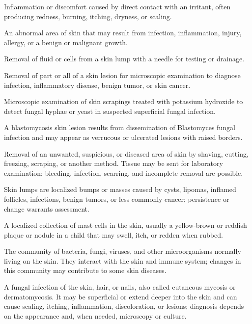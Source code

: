  Inflammation or discomfort caused by direct contact with an irritant, often producing redness, burning,
itching, dryness, or scaling.

 An abnormal area of skin that may result from infection, inflammation, injury, allergy, or a benign or malignant growth.

 Removal of fluid or cells from a skin lump with a needle for testing or drainage.

 Removal of part or all of a skin lesion for microscopic examination to diagnose infection, inflammatory disease, benign tumor, or skin cancer.

 Microscopic examination of skin scrapings treated with potassium hydroxide to detect fungal hyphae or yeast in suspected superficial fungal infection.

 A blastomycosis skin lesion results from dissemination of Blastomyces fungal infection and may appear as verrucous or ulcerated lesions with raised borders.

 Removal of an unwanted, suspicious, or diseased area of skin by shaving, cutting, freezing, scraping, or another method. Tissue may be sent for laboratory examination; bleeding, infection, scarring, and incomplete removal are possible.

 Skin lumps are localized bumps or masses caused by cysts, lipomas, inflamed follicles, infections, benign tumors, or less commonly cancer; persistence or change warrants assessment.

 A localized collection of mast cells in the skin, usually a yellow-brown or reddish plaque or nodule in a child that may swell, itch, or redden when rubbed.

 The community of bacteria, fungi, viruses, and other microorganisms normally living on the skin. They interact with the skin and immune system; changes in this community may contribute to some skin diseases.

 A fungal infection of the skin, hair, or nails, also called cutaneous mycosis or dermatomycosis. It may be superficial or extend deeper into the skin and can cause scaling, itching, inflammation, discoloration, or lesions; diagnosis depends on the appearance and, when needed, microscopy or culture.

